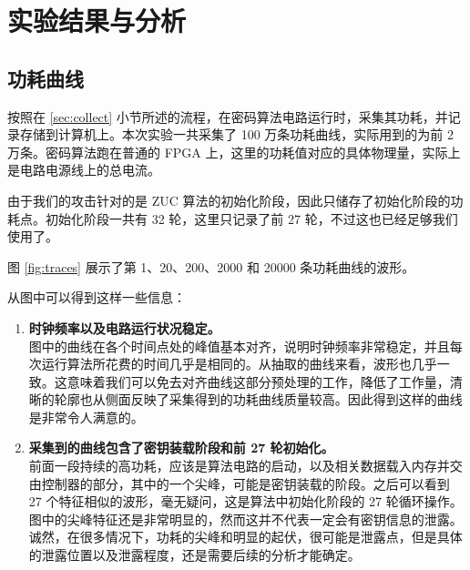 

\chapter{实验结果与分析}

\label{chap:results}

\section{功耗曲线}

按照在 \ref{sec:collect} 小节所述的流程，在密码算法电路运行时，采集其功耗，并记录存储到计算机上。本次实验一共采集了 100 万条功耗曲线，实际用到的为前 2 万条。密码算法跑在普通的 FPGA 上，这里的功耗值对应的具体物理量，实际上是电路电源线上的总电流。 \cite{zuc_fpga} \cite{zuc_fpga_en}

由于我们的攻击针对的是 ZUC 算法的初始化阶段，因此只储存了初始化阶段的功耗点。初始化阶段一共有 32 轮，这里只记录了前 27 轮，不过这也已经足够我们使用了。

\vspace*{\baselineskip}

图 \ref{fig:traces} 展示了第 1、20、200、2000 和 20000 条功耗曲线的波形。

从图中可以得到这样一些信息：

\begin{enumerate}
    \item \textbf{时钟频率以及电路运行状况稳定。}\\
    图中的曲线在各个时间点处的峰值基本对齐，说明时钟频率非常稳定，并且每次运行算法所花费的时间几乎是相同的。从抽取的曲线来看，波形也几乎一致。这意味着我们可以免去对齐曲线这部分预处理的工作，降低了工作量，清晰的轮廓也从侧面反映了采集得到的功耗曲线质量较高。因此得到这样的曲线是非常令人满意的。
    \item \textbf{采集到的曲线包含了密钥装载阶段和前 27 轮初始化。}\\
    前面一段持续的高功耗，应该是算法电路的启动，以及相关数据载入内存并交由控制器的部分，其中的一个尖峰，可能是密钥装载的阶段。之后可以看到 27 个特征相似的波形，毫无疑问，这是算法中初始化阶段的 27 轮循环操作。图中的尖峰特征还是非常明显的，然而这并不代表一定会有密钥信息的泄露。诚然，在很多情况下，功耗的尖峰和明显的起伏，很可能是泄露点，但是具体的泄露位置以及泄露程度，还是需要后续的分析才能确定。
\end{enumerate}

